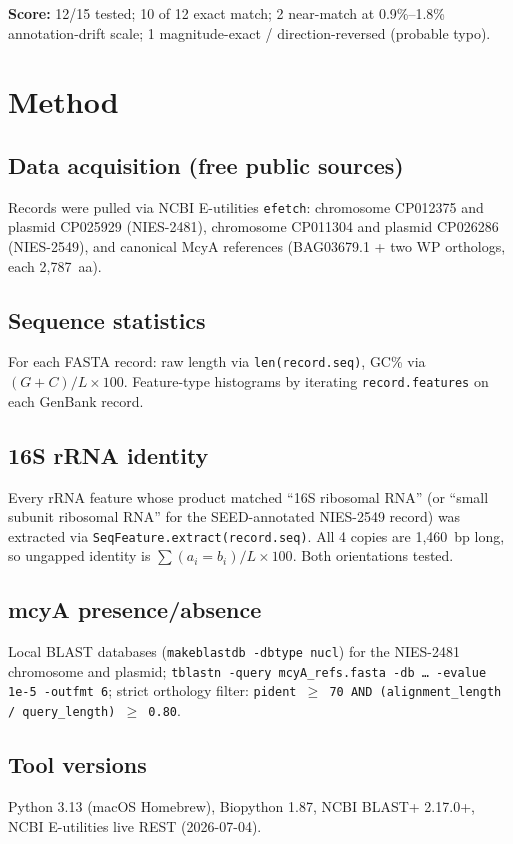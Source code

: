 \documentclass[11pt,letterpaper]{article}
\begin{document}
\noindent\textbf{Score:} 12/15 tested; 10 of 12 exact match; 2 near-match at 0.9\%--1.8\% annotation-drift scale; 1 magnitude-exact / direction-reversed (probable typo).

\section{Method}
\subsection{Data acquisition (free public sources)}
Records were pulled via NCBI E-utilities \texttt{efetch}: chromosome CP012375 and plasmid CP025929 (NIES-2481), chromosome CP011304 and plasmid CP026286 (NIES-2549), and canonical McyA references (BAG03679.1 + two WP orthologs, each 2{,}787~aa).

\subsection{Sequence statistics}
For each FASTA record: raw length via \texttt{len(record.seq)}, GC\% via $(G+C)/L\times100$. Feature-type histograms by iterating \texttt{record.features} on each GenBank record.

\subsection{16S rRNA identity}
Every rRNA feature whose product matched ``16S ribosomal RNA'' (or ``small subunit ribosomal RNA'' for the SEED-annotated NIES-2549 record) was extracted via \texttt{SeqFeature.extract(record.seq)}. All 4 copies are 1{,}460~bp long, so ungapped identity is $\sum(a_i=b_i)/L\times100$. Both orientations tested.

\subsection{mcyA presence/absence}
Local BLAST databases (\texttt{makeblastdb -dbtype nucl}) for the NIES-2481 chromosome and plasmid; \texttt{tblastn -query mcyA\_refs.fasta -db \dots{} -evalue 1e-5 -outfmt 6}; strict orthology filter: \texttt{pident $\geq$ 70 AND (alignment\_length / query\_length) $\geq$ 0.80}.

\subsection{Tool versions}
Python 3.13 (macOS Homebrew), Biopython 1.87, NCBI BLAST+ 2.17.0+, NCBI E-utilities live REST (2026-07-04).
\end{document}
